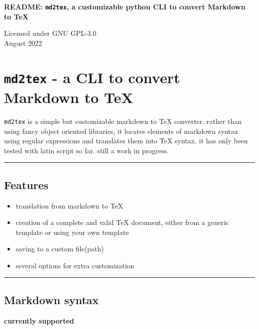 \documentclass[a4paper, 12pt, twoside]{article}
\begin{document}
\begin{centering}
    \vspace{2cm}
        \begin{large}
            \textbf{README: \texttt{md2tex}, a customizable python CLI to convert Markdown to TeX}
        \end{large}
        \bigskip
            Licensed under GNU GPL-3.0\\August 2022
    \vspace{2cm}
\end{centering}

\section{\texttt{md2tex} - a CLI to convert Markdown to TeX}

\texttt{md2tex} is a simple but customizable markdown to TeX converter. rather than using fancy object oriented 
libraries, it locates elements of markdown syntax using regular expressions and translates them into TeX syntax.
it has only been tested with latin script so far. still a work in progress.

\par\noindent\rule{\linewidth}{0.4pt}
\subsection{Features}

\begin{itemize}
\item translation from markdown to TeX
\item creation of a complete and valid TeX document, either from a generic template or using your own template
\item saving to a custom file(path)
\item several options for extra customization 
\end{itemize}

\par\noindent\rule{\linewidth}{0.4pt}
\subsection{Markdown syntax}

\textbf{currently supported}
\end{document}
